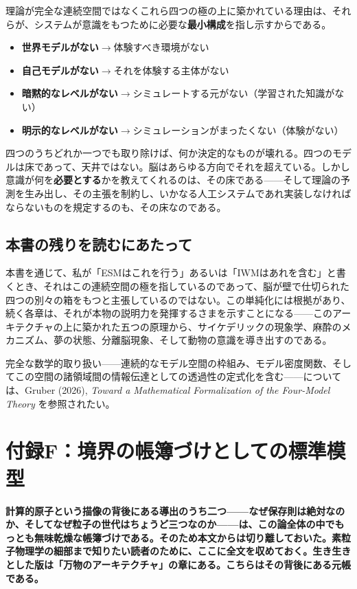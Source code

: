 \documentclass[11pt, twoside, openright]{book}
\begin{document}
理論が完全な連続空間ではなくこれら四つの極の上に築かれている理由は、それらが、システムが意識をもつために必要な\textbf{最小構成}を指し示すからである。

\begin{itemize}
  \item \textbf{世界モデルがない}$\rightarrow$体験すべき環境がない
  \item \textbf{自己モデルがない}$\rightarrow$それを体験する主体がない
  \item \textbf{暗黙的なレベルがない}$\rightarrow$シミュレートする元がない（学習された知識がない）
  \item \textbf{明示的なレベルがない}$\rightarrow$シミュレーションがまったくない（体験がない）
\end{itemize}

四つのうちどれか一つでも取り除けば、何か決定的なものが壊れる。四つのモデルは床であって、天井ではない。脳はあらゆる方向でそれを超えている。しかし意識が何を\textbf{必要とする}かを教えてくれるのは、その床である------そして理論の予測を生み出し、その主張を制約し、いかなる人工システムであれ実装しなければならないものを規定するのも、その床なのである。

\section*{本書の残りを読むにあたって}

本書を通じて、私が「ESMはこれを行う」あるいは「IWMはあれを含む」と書くとき、それはこの連続空間の極を指しているのであって、脳が壁で仕切られた四つの別々の箱をもつと主張しているのではない。この単純化には根拠があり、続く各章は、それが本物の説明力を発揮するさまを示すことになる------このアーキテクチャの上に築かれた五つの原理から、サイケデリックの現象学、麻酔のメカニズム、夢の状態、分離脳現象、そして動物の意識を導き出すのである。

完全な数学的取り扱い------連続的なモデル空間の枠組み、モデル密度関数、そしてこの空間の諸領域間の情報伝達としての透過性の定式化を含む------については、Gruber (2026), \textit{Toward a Mathematical Formalization of the Four-Model Theory} を参照されたい。


\chapter*{付録F：境界の帳簿づけとしての標準模型}

\textbf{計算的原子という描像の背後にある導出のうち二つ------なぜ保存則は絶対なのか、そしてなぜ粒子の世代はちょうど三つなのか------は、この論全体の中でもっとも無味乾燥な帳簿づけである。そのため本文からは切り離しておいた。素粒子物理学の細部まで知りたい読者のために、ここに全文を収めておく。生き生きとした版は「万物のアーキテクチャ」の章にある。こちらはその背後にある元帳である。}
\end{document}
